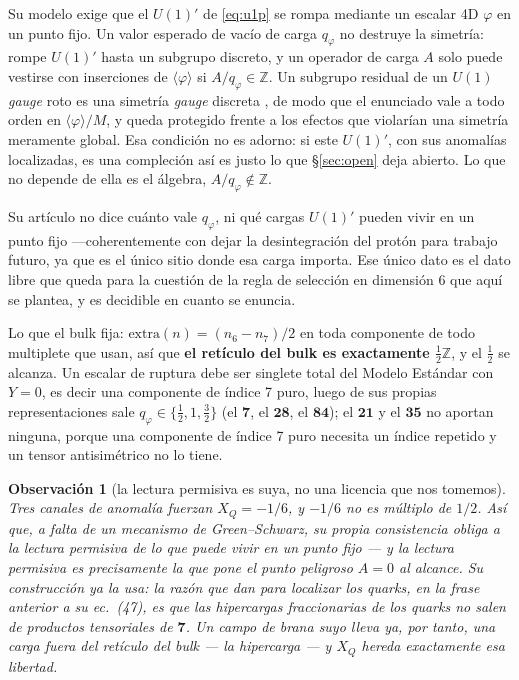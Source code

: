 \documentclass[11pt,a4paper]{article}
\newtheorem{observation}{Observación}
\newcommand{\ZZ}{\mathbb{Z}}
\newcommand{\rep}[1]{\mathbf{#1}}
\begin{document}
Su modelo exige que el $U(1)'$ de \eqref{eq:u1p} se rompa mediante un escalar 4D $\varphi$ en un
punto fijo. Un valor esperado de vacío de carga $q_\varphi$ no destruye la simetría: rompe $U(1)'$
hasta un subgrupo discreto, y un operador de carga $A$ solo puede vestirse con inserciones de
$\langle\varphi\rangle$ si $A/q_\varphi\in\ZZ$. Un subgrupo residual de un $U(1)$ \emph{gauge} roto
es una simetría \emph{gauge} discreta \cite{KW,IR}, de modo que el enunciado vale a todo orden en
$\langle\varphi\rangle/M$, y queda protegido frente a los efectos que violarían una simetría
meramente global. Esa condición no es adorno: si este $U(1)'$, con sus anomalías localizadas, es
una compleción así es justo lo que \S\ref{sec:open} deja abierto. Lo que no depende de ella es el
álgebra, $A/q_\varphi\notin\ZZ$.

Su artículo no dice cuánto vale $q_\varphi$, ni qué cargas $U(1)'$ pueden vivir en un punto fijo
---coherentemente con dejar la desintegración del protón para trabajo futuro, ya que es el único
sitio donde esa carga importa. Ese único dato es el dato libre que queda para la cuestión de la regla
de selección en dimensión 6 que aquí se plantea, y es decidible en cuanto se enuncia.

Lo que el bulk fija: $\mathrm{extra}(n)=(n_6-n_7)/2$ en toda componente de todo multiplete que usan,
así que \textbf{el retículo del bulk es exactamente $\tfrac12\ZZ$}, y el $\tfrac12$ se alcanza. Un
escalar de ruptura debe ser singlete total del Modelo Estándar con $Y=0$, es decir una componente de
índice 7 puro, luego de sus propias representaciones sale
$q_\varphi\in\{\tfrac12,1,\tfrac32\}$ (el $\rep7$, el $\rep{28}$, el $\rep{84}$); el $\rep{21}$ y el
$\rep{35}$ no aportan ninguna, porque una componente de índice 7 puro necesita un índice repetido y
un tensor antisimétrico no lo tiene.

\begin{observation}[la lectura permisiva es suya, no una licencia que nos tomemos]
Tres canales de anomalía fuerzan $X_Q=-1/6$, y $-1/6$ no es múltiplo de $1/2$. Así que, a falta de un
mecanismo de Green--Schwarz, su propia consistencia obliga a la lectura \emph{permisiva} de lo que
puede vivir en un punto fijo --- y la lectura permisiva es precisamente la que pone el punto
peligroso $A=0$ al alcance. Su construcción ya la usa: la razón que dan para localizar los quarks, en
la frase anterior a su ec.~(47), es que las hipercargas fraccionarias de los quarks no salen de
productos tensoriales de $\rep7$. Un campo de brana suyo lleva ya, por tanto, una carga fuera del
retículo del bulk --- la hipercarga --- y $X_Q$ hereda exactamente esa libertad.
\end{observation}
\end{document}
